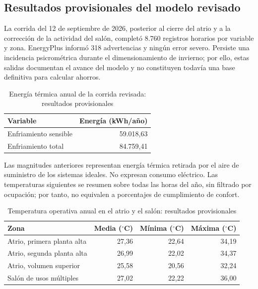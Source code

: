 \subsection{Resultados provisionales del modelo revisado}
\begin{textoDosTercios}
La corrida del 12 de septiembre de 2026, posterior al cierre del atrio y a la corrección de la actividad del salón, completó 8.760 registros horarios por variable y zona. EnergyPlus informó 318 advertencias y ningún error severo. Persiste una incidencia psicrométrica durante el dimensionamiento de invierno; por ello, estas salidas documentan el avance del modelo y no constituyen todavía una base definitiva para calcular ahorros.
\end{textoDosTercios}
\begin{table}[H]
\centering
\caption{Energía térmica anual de la corrida revisada: resultados provisionales}
\label{tab:db-energia-revisada}
{\small\begin{tabular}{lr}
\toprule
Variable & Energía (kWh/año) \\
\midrule
Enfriamiento sensible & 59.018,63 \\
Enfriamiento total & 84.759,41 \\
\bottomrule
\end{tabular}}
\end{table}
\begin{textoDosTercios}
Las magnitudes anteriores representan energía térmica retirada por el aire de suministro de los sistemas ideales. No expresan consumo eléctrico. Las temperaturas siguientes se resumen sobre todas las horas del año, sin filtrado por ocupación; por tanto, no equivalen a porcentajes de cumplimiento de confort.
\end{textoDosTercios}
\begin{table}[H]
\centering
\caption{Temperatura operativa anual en el atrio y el salón: resultados provisionales}
\label{tab:db-temperatura-revisada}
{\small\begin{tabular}{lrrr}
\toprule
Zona & Media ($^\circ$C) & Mínima ($^\circ$C) & Máxima ($^\circ$C) \\
\midrule
Atrio, primera planta alta & 27,36 & 22,64 & 34,19 \\
Atrio, segunda planta alta & 26,99 & 22,02 & 34,37 \\
Atrio, volumen superior & 25,58 & 20,56 & 32,24 \\
Salón de usos múltiples & 27,02 & 22,22 & 36,00 \\
\bottomrule
\end{tabular}}
\end{table}
\par\medskip
